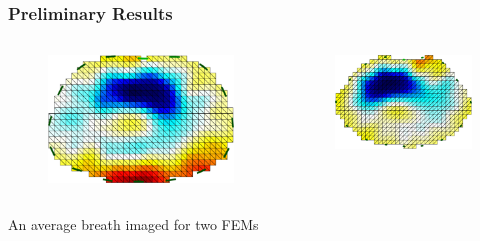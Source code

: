 \documentclass[10pt,    %
    english,            %
    xcolor=table,       %
    envcountsect,        %
    aspectratio=1610
]{beamer}
\begin{document}
\begin{frame}
	\frametitle{Preliminary Results}   
	\begin{columns}[c]
		\begin{column}{0.5\textwidth}
		\begin{figure}[H]
			\centering
			\includegraphics[width=\textwidth]{generic_fem.png}
		\end{figure}
		\end{column}
		\begin{column}{0.5\textwidth}
			\begin{figure}[H]
				\centering
				\includegraphics[width=\textwidth]{new_fem.png}
			\end{figure}
		\end{column}
	\end{columns} 
\vspace{1em}
An average breath imaged for two FEMs
	
\end{frame}
\end{document}
